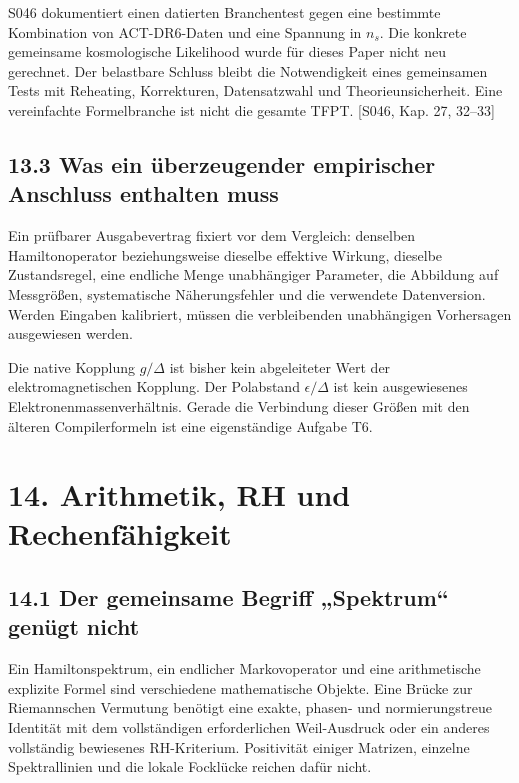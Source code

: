 S046 dokumentiert einen datierten Branchentest gegen eine bestimmte
Kombination von ACT-DR6-Daten und eine Spannung in \(n_s\). Die konkrete
gemeinsame kosmologische Likelihood wurde für dieses Paper nicht neu
gerechnet. Der belastbare Schluss bleibt die Notwendigkeit eines
gemeinsamen Tests mit Reheating, Korrekturen, Datensatzwahl und
Theorieunsicherheit. Eine vereinfachte Formelbranche ist nicht die
gesamte TFPT. {[}S046, Kap. 27, 32--33{]}

\subsection{13.3 Was ein überzeugender empirischer Anschluss enthalten
muss}\label{was-ein-uxfcberzeugender-empirischer-anschluss-enthalten-muss}

Ein prüfbarer Ausgabevertrag fixiert vor dem Vergleich: denselben
Hamiltonoperator beziehungsweise dieselbe effektive Wirkung, dieselbe
Zustandsregel, eine endliche Menge unabhängiger Parameter, die Abbildung
auf Messgrößen, systematische Näherungsfehler und die verwendete
Datenversion. Werden Eingaben kalibriert, müssen die verbleibenden
unabhängigen Vorhersagen ausgewiesen werden.

Die native Kopplung \(g/\Delta\) ist bisher kein abgeleiteter Wert der
elektromagnetischen Kopplung. Der Polabstand \(\epsilon/\Delta\) ist
kein ausgewiesenes Elektronenmassenverhältnis. Gerade die Verbindung
dieser Größen mit den älteren Compilerformeln ist eine eigenständige
Aufgabe T6.

\section{14. Arithmetik, RH und
Rechenfähigkeit}\label{arithmetik-rh-und-rechenfuxe4higkeit}

\subsection{14.1 Der gemeinsame Begriff „Spektrum`` genügt
nicht}\label{der-gemeinsame-begriff-spektrum-genuxfcgt-nicht}

Ein Hamiltonspektrum, ein endlicher Markovoperator und eine
arithmetische explizite Formel sind verschiedene mathematische Objekte.
Eine Brücke zur Riemannschen Vermutung benötigt eine exakte, phasen- und
normierungstreue Identität mit dem vollständigen erforderlichen
Weil-Ausdruck oder ein anderes vollständig bewiesenes RH-Kriterium.
Positivität einiger Matrizen, einzelne Spektrallinien und die lokale
Focklücke reichen dafür nicht.

